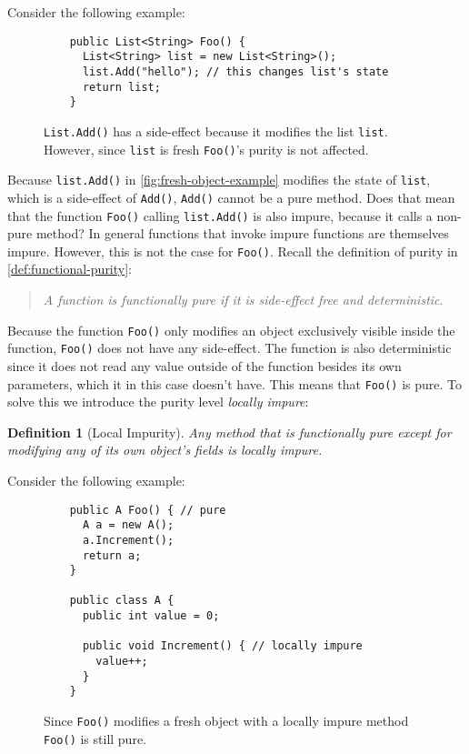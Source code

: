 \documentclass[a4paper,12pt]{article}
\newtheorem{definition}{Definition} %
\begin{document}
Consider the following example:

\begin{figure}[H]
  \centering
  \begin{lstlisting}
    public List<String> Foo() {
      List<String> list = new List<String>();
      list.Add("hello"); // this changes list's state
      return list;
    }
  \end{lstlisting}
  \caption{\texttt{List.Add()} has a side-effect because it modifies the list \texttt{list}. However, since \texttt{list} is fresh \texttt{Foo()}'s purity is not affected.}
  \label{fig:fresh-object-example}
\end{figure}

Because \texttt{list.Add()} in \autoref{fig:fresh-object-example} modifies the state of \texttt{list}, which is a side-effect of \texttt{Add()}, \texttt{Add()} cannot be a pure method. Does that mean that the function \texttt{Foo()} calling \texttt{list.Add()} is also impure, because it calls a non-pure method? In general functions that invoke impure functions are themselves impure. However, this is not the case for \texttt{Foo()}. Recall the definition of purity in \autoref{def:functional-purity}:

\begin{quote}
  \textit{A function is functionally pure if it is side-effect free and deterministic}.
\end{quote}

Because the function \texttt{Foo()} only modifies an object exclusively visible inside the function, \texttt{Foo()} does not have any side-effect. The function is also deterministic since it does not read any value outside of the function besides its own parameters, which it in this case doesn't have. This means that \texttt{Foo()} is pure. To solve this we introduce the purity level \textit{locally impure}:

\begin{definition}[Local Impurity] \label{def:locally-impure}
  Any method that is functionally pure except for modifying any of its own object's fields is locally impure.
\end{definition}

Consider the following example:

\begin{figure}[H]
  \centering
  \begin{lstlisting}
    public A Foo() { // pure
      A a = new A();
      a.Increment();
      return a;
    }

    public class A {
      public int value = 0;

      public void Increment() { // locally impure
        value++;
      }
    }
  \end{lstlisting}
  \caption{Since \texttt{Foo()} modifies a fresh object with a locally impure method \texttt{Foo()} is still pure.}
  \label{fig:locally-impure-example}
\end{figure}
\end{document}
